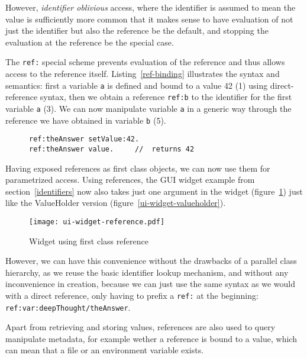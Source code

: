 \documentclass[preprint,authoryear]{acm_proc_article-sp}
\begin{document}
However, {\em identifier oblivious} access, where the identifier is assumed to mean the
value is sufficiently more common that it makes sense to have evaluation of not just
the identifier but also the reference be the default, and stopping the evaluation at the
reference be the special case.

The {\tt ref:} special scheme prevents evaluation of the reference and thus allows access
to the reference itself.  Listing~\ref{ref-binding} illustrates the syntax and semantics:
first a variable {\tt a} is defined and bound to a value 42 (1) using direct-reference syntax,
then we obtain a reference {\tt ref:b} to
the identifier for the first variable {\tt a} (3).  We can now manipulate variable {\tt a} 
in a generic way through the reference we have obtained in variable {\tt b} (5).  

\begin{figure}[htbp]
\begin{lstlisting}[style=numbers,label=ref-binding,caption=Accessing a variable via its reference.]
ref:theAnswer setValue:42.  
ref:theAnswer value.     //  returns 42
\end{lstlisting}
\end{figure}

Having exposed references as first class objects, we can now use them for parametrized 
access.   Using references, the GUI widget example from section~\ref{identifiers} now
also takes just one argument in the widget (figure~\ref{ui-widget-reference}) just like
the ValueHolder version (figure~\ref{ui-widget-valueholder}).

\begin{figure}[htbp]
\begin{center}
\texttt{[image: ui-widget-reference.pdf]}
\caption{Widget using first class reference}
\label{ui-widget-reference}
\end{center}
\end{figure}

However, we can have this convenience without the drawbacks of a parallel class
hierarchy, as we reuse the basic identifier lookup mechanism, and without any
inconvenience in creation, because we can just use the same syntax as we would
with a direct reference, only having to prefix a {\tt ref:} at the beginning:  {\tt ref:var:deepThought/theAnswer}.




Apart from retrieving and storing values, references are also used to query manipulate
metadata, for example wether a reference is bound to a value, which can mean that
a file or an environment variable exists.
\end{document}
